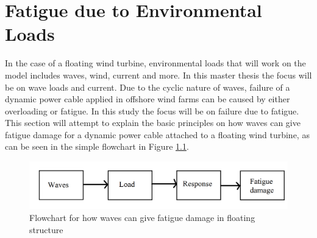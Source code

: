 \chapter{Fatigue due to Environmental Loads}
\label{chap:fatigue}
In the case of a floating wind turbine, environmental loads that will work on the model includes waves, wind, current and more. In this master thesis the focus will be on wave loads and current. Due to the cyclic nature of waves, failure of a dynamic power cable applied in offshore wind farms can be caused by either overloading or fatigue. In this study the focus will be on failure due to fatigue. This section will attempt to explain the basic principles on how waves can give fatigue damage for a dynamic power cable attached to a floating wind turbine, as can be seen in the simple flowchart in Figure \ref{fig:flowchart}. 

\begin{figure}[h!]
\centering
\includegraphics[scale=0.75]{figures/box}
\caption[$\; \:$Flowchart]{Flowchart for how waves can give fatigue damage in floating structure}
 \label{fig:flowchart}
\end{figure}

